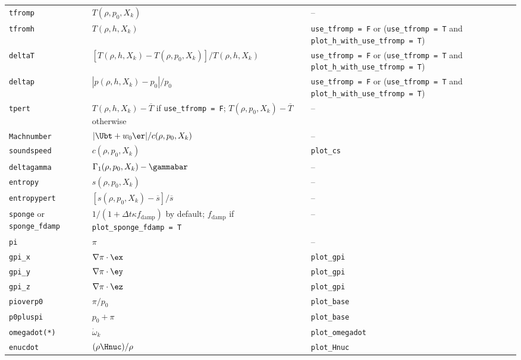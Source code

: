 {\begin{center}
\begin{longtable}{|l|p{2.25in}|p{2.5in}|}
{\tt tfromp}              & $T(\rho, p_0, X_k)$  & -- \\
{\tt tfromh}            & $T(\rho, h, X_k)$    & {\tt use\_tfromp = F} or ({\tt use\_tfromp = T} and {\tt plot\_h\_with\_use\_tfromp = T}) \\           
{\tt deltaT}            & $[T(\rho, h, X_k) - T(\rho, p_0, X_k)]/T(\rho, h, X_k)$  & {\tt use\_tfromp = F} or ({\tt use\_tfromp = T} and {\tt plot\_h\_with\_use\_tfromp = T}) \\           
{\tt deltap}            & $|p(\rho,h,X_k) - p_0|/p_0$ & {\tt use\_tfromp = F} or ({\tt use\_tfromp = T} and {\tt plot\_h\_with\_use\_tfromp = T}) \\           
{\tt tpert}               & $T(\rho,h,X_k) - \overline{T}$ if {\tt use\_tfromp = F}; $T(\rho,p_0,X_k) - \overline{T}$ otherwise & -- \\
{\tt Machnumber}          & $| \Ubt + w_0 \er | / c(\rho,p_0,X_k)$ & -- \\
{\tt soundspeed}        & $c(\rho,p_0,X_k)$ & {\tt plot\_cs} \\
{\tt deltagamma}          & $\Gamma_1(\rho,p_0,X_k) - \gammabar$ & -- \\
{\tt entropy}             & $s(\rho,p_0,X_k)$ & -- \\
{\tt entropypert}         & $[s(\rho,p_0,X_k) - \overline{s}]/\overline{s}$ & -- \\
{\tt sponge} or {\tt sponge\_fdamp} & $1/(1 + \Delta t \kappa f_\mathrm{damp})$ by default; $f_\mathrm{damp}$ if {\tt plot\_sponge\_fdamp = T} & -- \\
{\tt pi}                 & $\pi$ & -- \\
{\tt gpi\_x}           & $\nabla \pi \cdot \ex$ & {\tt plot\_gpi} \\
{\tt gpi\_y}           & $\nabla \pi \cdot \ey$ & {\tt plot\_gpi} \\
{\tt gpi\_z}           & $\nabla \pi \cdot \ez$ & {\tt plot\_gpi} \\
{\tt pioverp0}         & $\pi / p_0$ & {\tt plot\_base} \\
{\tt p0pluspi}         & $p_0 + \pi$ & {\tt plot\_base} \\
{\tt omegadot(*)}      & $\dot{\omega}_k$ & {\tt plot\_omegadot} \\
{\tt enucdot}          & $(\rho \Hnuc)/\rho$ & {\tt plot\_Hnuc} \\

\end{longtable}
\end{center}}
